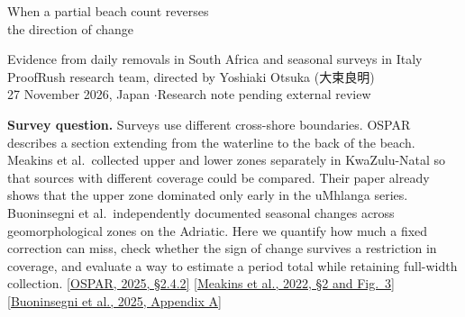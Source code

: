 \documentclass[10pt]{article}
\newcommand{\para}[1]{\medskip\textbf{#1}\enspace}
\newcommand{\src}[2]{\href{#1}{[#2]}}
\begin{document}
\begin{center}
{\LARGE When a partial beach count reverses\\[2pt] the direction of change\par}
\vspace{6pt}
{\large Evidence from daily removals in South Africa and seasonal surveys in Italy}\\[6pt]
ProofRush research team, directed by Yoshiaki Otsuka ({\namefont 大束良明})\\
{\small 27 November 2026, Japan \quad$\cdot$\quad Research note pending external review}
\end{center}

\begin{abstract}
We examined whether counts from one part of a beach track changes in the total number of objects collected across the surveyed beach. In 19 daily removals on two South African beaches, the upper zone accounted for about 64\% of the period total at each site. Yet five of 17 consecutive changes had opposite signs in the upper zone and across both zones. At uMhlanga, any fixed correction factor incurs at least 57.78\% relative error on one observed day. An independent seasonal series from Italy also contained a reversal after omitting the swash zone. For the South African records we replayed a survey design that retains full removal but counts a random subset of the lower-zone bags. Nine of 19 lower-zone counts sufficed for at least 95\% of assignments to place both site-period totals within 20\% of the observed values. All probabilities refer to these fixed historical counts.
\end{abstract}

\para{Survey question.}
Surveys use different cross-shore boundaries. OSPAR describes a section extending from the waterline to the back of the beach. Meakins et al.\ collected upper and lower zones separately in KwaZulu-Natal so that sources with different coverage could be compared. Their paper already shows that the upper zone dominated only early in the uMhlanga series. Buoninsegni et al.\ independently documented seasonal changes across geomorphological zones on the Adriatic. Here we quantify how much a fixed correction can miss, check whether the sign of change survives a restriction in coverage, and evaluate a way to estimate a period total while retaining full-width collection.
\src{https://www.ospar.org/documents?v=44122}{OSPAR, 2025, \S2.4.2}
\src{https://doi.org/10.1016/j.rsma.2022.102421}{Meakins et al., 2022, \S2 and Fig.\ 3}
\src{https://doi.org/10.3390/w17152173}{Buoninsegni et al., 2025, Appendix A}
\end{document}
